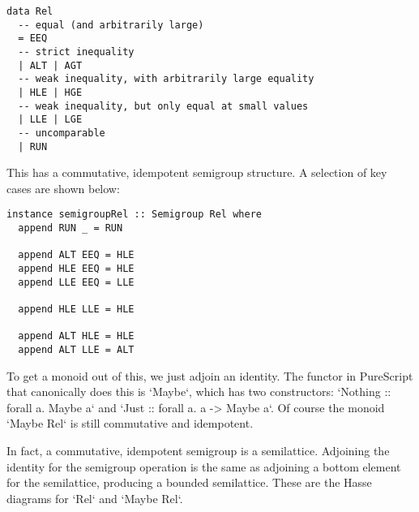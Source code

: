 \documentclass[11pt, twoside, reqno]{book}
\begin{document}
\begin{verbatim}
data Rel
  -- equal (and arbitrarily large)
  = EEQ
  -- strict inequality
  | ALT | AGT
  -- weak inequality, with arbitrarily large equality
  | HLE | HGE
  -- weak inequality, but only equal at small values
  | LLE | LGE
  -- uncomparable
  | RUN
\end{verbatim}

This has a commutative, idempotent semigroup structure.
A selection of key cases are shown below:
\begin{verbatim}
instance semigroupRel :: Semigroup Rel where
  append RUN _ = RUN

  append ALT EEQ = HLE
  append HLE EEQ = HLE
  append LLE EEQ = LLE

  append HLE LLE = HLE

  append ALT HLE = HLE
  append ALT LLE = ALT
\end{verbatim}

To get a monoid out of this, we just adjoin an identity.
The functor in PureScript that canonically does this is \inHS`Maybe`, which has two constructors: \inHS`Nothing :: forall a. Maybe a` and \inHS`Just :: forall a. a -> Maybe a`.
Of course the monoid \inHS`Maybe Rel` is still commutative and idempotent.

In fact, a commutative, idempotent semigroup is a semilattice.
Adjoining the identity for the semigroup operation is the same as adjoining a bottom element for the semilattice, producing a bounded semilattice.
These are the Hasse diagrams for \inHS`Rel` and \inHS`Maybe Rel`.
\end{document}
